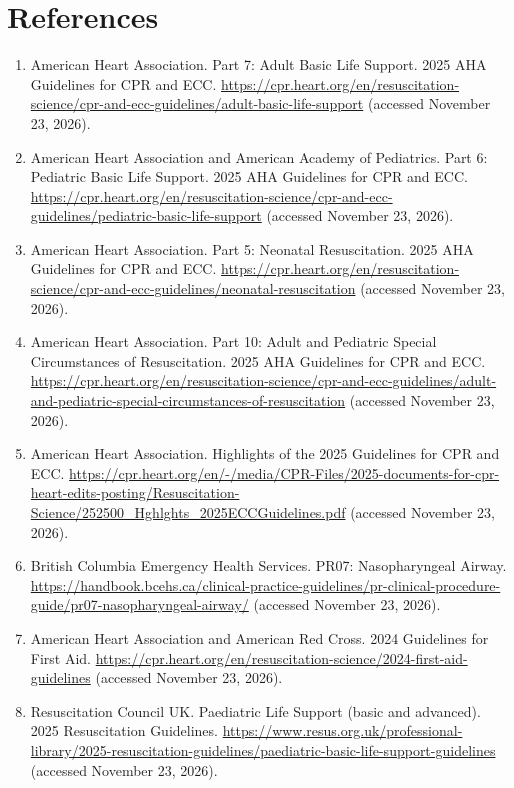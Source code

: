 \section*{References}
\begin{enumerate}
  \item American Heart Association. Part 7: Adult Basic Life Support. 2025 AHA Guidelines for CPR and ECC. \url{https://cpr.heart.org/en/resuscitation-science/cpr-and-ecc-guidelines/adult-basic-life-support} (accessed November 23, 2026).
  \item American Heart Association and American Academy of Pediatrics. Part 6: Pediatric Basic Life Support. 2025 AHA Guidelines for CPR and ECC. \url{https://cpr.heart.org/en/resuscitation-science/cpr-and-ecc-guidelines/pediatric-basic-life-support} (accessed November 23, 2026).
  \item American Heart Association. Part 5: Neonatal Resuscitation. 2025 AHA Guidelines for CPR and ECC. \url{https://cpr.heart.org/en/resuscitation-science/cpr-and-ecc-guidelines/neonatal-resuscitation} (accessed November 23, 2026).
  \item American Heart Association. Part 10: Adult and Pediatric Special Circumstances of Resuscitation. 2025 AHA Guidelines for CPR and ECC. \url{https://cpr.heart.org/en/resuscitation-science/cpr-and-ecc-guidelines/adult-and-pediatric-special-circumstances-of-resuscitation} (accessed November 23, 2026).
  \item American Heart Association. Highlights of the 2025 Guidelines for CPR and ECC. \url{https://cpr.heart.org/en/-/media/CPR-Files/2025-documents-for-cpr-heart-edits-posting/Resuscitation-Science/252500_Hghlghts_2025ECCGuidelines.pdf} (accessed November 23, 2026).
  \item British Columbia Emergency Health Services. PR07: Nasopharyngeal Airway. \url{https://handbook.bcehs.ca/clinical-practice-guidelines/pr-clinical-procedure-guide/pr07-nasopharyngeal-airway/} (accessed November 23, 2026).
  \item American Heart Association and American Red Cross. 2024 Guidelines for First Aid. \url{https://cpr.heart.org/en/resuscitation-science/2024-first-aid-guidelines} (accessed November 23, 2026).
  \item Resuscitation Council UK. Paediatric Life Support (basic and advanced). 2025 Resuscitation Guidelines. \url{https://www.resus.org.uk/professional-library/2025-resuscitation-guidelines/paediatric-basic-life-support-guidelines} (accessed November 23, 2026).
\end{enumerate}

\clearpage
